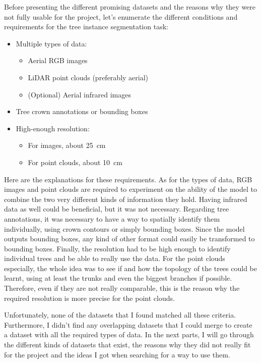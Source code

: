 \documentclass[
]{report}
\providecommand{\tightlist}{%
  \setlength{\itemsep}{0pt}\setlength{\parskip}{0pt}}\usepackage{longtable,booktabs,array}
\begin{document}
Before presenting the different promising datasets and the reasons why
they were not fully usable for the project, let's enumerate the
different conditions and requirements for the tree instance segmentation
task:

\begin{itemize}
\tightlist
\item
  Multiple types of data:

  \begin{itemize}
  \tightlist
  \item
    Aerial RGB images
  \item
    LiDAR point clouds (preferably aerial)
  \item
    (Optional) Aerial infrared images
  \end{itemize}
\item
  Tree crown annotations or bounding boxes
\item
  High-enough resolution:

  \begin{itemize}
  \tightlist
  \item
    For images, about 25~cm
  \item
    For point clouds, about 10~cm
  \end{itemize}
\end{itemize}

Here are the explanations for these requirements. As for the types of
data, RGB images and point clouds are required to experiment on the
ability of the model to combine the two very different kinds of
information they hold. Having infrared data as well could be beneficial,
but it was not necessary. Regarding tree annotations, it was necessary
to have a way to spatially identify them individually, using crown
contours or simply bounding boxes. Since the model outputs bounding
boxes, any kind of other format could easily be transformed to bounding
boxes. Finally, the resolution had to be high enough to identify
individual trees and be able to really use the data. For the point
clouds especially, the whole idea was to see if and how the topology of
the trees could be learnt, using at least the trunks and even the
biggest branches if possible. Therefore, even if they are not really
comparable, this is the reason why the required resolution is more
precise for the point clouds.

Unfortunately, none of the datasets that I found matched all these
criteria. Furthermore, I didn't find any overlapping datasets that I
could merge to create a dataset with all the required types of data. In
the next parts, I will go through the different kinds of datasets that
exist, the reasons why they did not really fit for the project and the
ideas I got when searching for a way to use them.
\end{document}
